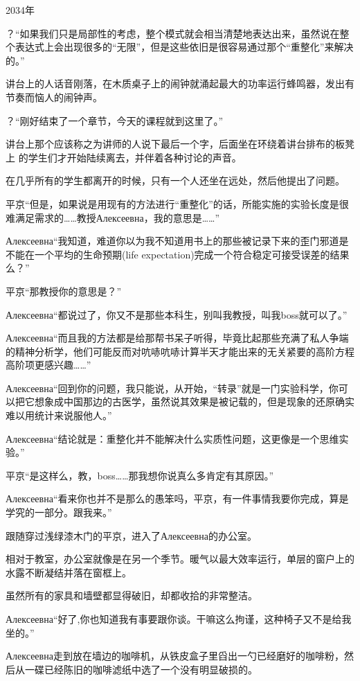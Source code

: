 \documentclass{article}
\begin{document}
\centerline{2034年}

？“如果我们只是局部性的考虑，整个模式就会相当清楚地表达出来，虽然说在整个表达式上会出现很多的“无限”，但是这些依旧是很容易通过那个“重整化”来解决的。”

讲台上的人话音刚落，在木质桌子上的闹钟就涌起最大的功率运行蜂鸣器，发出有节奏而恼人的闹钟声。

？“刚好结束了一个章节，今天的课程就到这里了。”

讲台上那个应该称之为讲师的人说下最后一个字，后面坐在环绕着讲台排布的板凳上
的学生们才开始陆续离去，并伴着各种讨论的声音。

在几乎所有的学生都离开的时候，只有一个人还坐在远处，然后他提出了问题。

平京“但是，如果说是用现有的方法进行“重整化”的话，所能实施的实验长度是很难满足需求的……教授Алексеевна，我的意思是……”

Алексеевна“我知道，难道你以为我不知道用书上的那些被记录下来的歪门邪道是不能在一个平均的生命预期(life expectation)完成一个符合稳定可接受误差的结果么？”

平京“那教授你的意思是？”

Алексеевна“都说过了，你又不是那些本科生，别叫我教授，叫我boss就可以了。”

Алексеевна“而且我的方法都是给那帮书呆子听得，毕竟比起那些充满了私人争端的精神分析学，他们可能反而对吭哧吭哧计算半天才能出来的无关紧要的高阶方程高阶项更感兴趣……”

Алексеевна“回到你的问题，我只能说，从开始，“转录”就是一门实验科学，你可以把它想象成中国那边的古医学，虽然说其效果是被记载的，但是现象的还原确实难以用统计来说服他人。”

Алексеевна“结论就是：重整化并不能解决什么实质性问题，这更像是一个思维实验。”

平京“是这样么，教，boss……那我想你说真么多肯定有其原因。”

Алексеевна“看来你也并不是那么的愚笨吗，平京，有一件事情我要你完成，算是学究的一部分。跟我来。”

跟随穿过浅绿漆木门的平京，进入了Алексеевна的办公室。

相对于教室，办公室就像是在另一个季节。暖气以最大效率运行，单层的窗户上的水露不断凝结并落在窗框上。

虽然所有的家具和墙壁都显得破旧，却都收拾的非常整洁。

Алексеевна“好了,你也知道我有事要跟你谈。干嘛这么拘谨，这种椅子又不是给我坐的。”

Алексеевна走到放在墙边的咖啡机，从铁皮盒子里舀出一勺已经磨好的咖啡粉，然后从一碟已经陈旧的咖啡滤纸中选了一个没有明显破损的。
\end{document}
